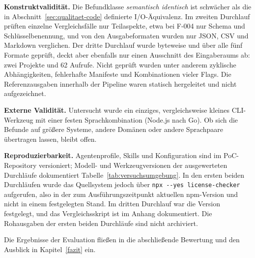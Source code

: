 \textbf{Konstruktvalidität.} Die Befundklasse \emph{semantisch identisch} ist schwächer als die in Abschnitt~\ref{sec:qualitaet-code} definierte I/O-Äquivalenz. Im zweiten Durchlauf prüften einzelne Vergleichsfälle nur Teilaspekte, etwa bei F-004 nur Schema und Schlüsselbenennung, und von den Ausgabeformaten wurden nur JSON, CSV und Markdown verglichen. Der dritte Durchlauf wurde byteweise und über alle fünf Formate geprüft, deckt aber ebenfalls nur einen Ausschnitt des Eingaberaums ab: zwei Projekte und 62 Aufrufe. Nicht geprüft wurden unter anderem zyklische Abhängigkeiten, fehlerhafte Manifeste und Kombinationen vieler Flags. Die Referenzausgaben innerhalb der Pipeline waren statisch hergeleitet und nicht aufgezeichnet.

\textbf{Externe Validität.} Untersucht wurde ein einziges, vergleichsweise kleines CLI-Werkzeug mit einer festen Sprachkombination (Node.js nach Go). Ob sich die Befunde auf größere Systeme, andere Domänen oder andere Sprachpaare übertragen lassen, bleibt offen.

\textbf{Reproduzierbarkeit.} Agentenprofile, Skills und Konfiguration sind im PoC-Repository versioniert; Modell- und Werkzeugversionen der ausgewerteten Durchläufe dokumentiert Tabelle~\ref{tab:versuchsumgebung}. In den ersten beiden Durchläufen wurde das Quellsystem jedoch über \texttt{npx -{}-yes license-checker} aufgerufen, also in der zum Ausführungszeitpunkt aktuellen npm-Version und nicht in einem festgelegten Stand. Im dritten Durchlauf war die Version festgelegt, und das Vergleichsskript ist im Anhang dokumentiert. Die Rohausgaben der ersten beiden Durchläufe sind nicht archiviert.

Die Ergebnisse der Evaluation fließen in die abschließende Bewertung und den Ausblick in Kapitel~\ref{fazit} ein.
